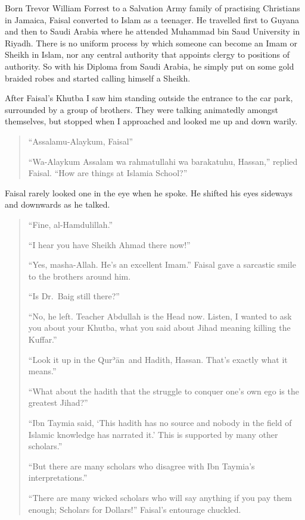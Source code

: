 \documentclass[12pt]{memoir}
\def\´{ʾ} %
\newcommand{\cor}[2]{#2} %
\def \Quran{Qur\-\´ān} %
\begin{document}
Born Trevor William Forrest to a Salvation Army family
of practising Christians in Jamaica,
Faisal converted to Islam as a teenager.
He travelled first to Guyana and then to Saudi Arabia
where he attended Muhammad bin Saud University in Riyadh.
There is no uniform process by which someone
can become an Imam or Sheikh in Islam,
nor any central authority that appoints clergy to positions of authority.
So with his Diploma from Saudi Arabia,
he simply put on some gold braided robes
and started calling himself a Sheikh.

After Faisal’s Khutba I saw him standing outside the entrance to the car park,
surrounded by a group of brothers.
They were talking animatedly amongst themselves,
but stopped when I approached and looked me up and down warily.

\begin{quote}
“Assalamu-Alaykum, Faisal”

“Wa-Alaykum Assalam wa rahmatullahi wa barakatuhu, Hassan,” replied Faisal.
“How are things at Islamia School?”
\end{quote}

Faisal rarely looked one in the eye when he spoke.
He shifted his eyes sideways and downwards as he talked.

\begin{quote}
“Fine, al-\cor{Hamdulilah}{Hamdulillah}.”

“I hear you have Sheikh Ahmad there now!”

“Yes, masha-Allah.
He’s an excellent Imam.”
Faisal gave a sarcastic smile to the brothers around him.

“Is Dr.\ Baig still there?”

“No, he left.
Teacher Abdullah is the Head now.
Listen, I wanted to ask you about your Khutba,
what you said about Jihad meaning killing the Kuffar.”

“Look it up in the \Quran\ and Hadith, Hassan.
That’s exactly what it means.”

“What about the hadith that the struggle to conquer one’s own ego
is the greatest Jihad?”

“Ibn Taymia said,
‘This hadith has no source and nobody in the field of Islamic knowledge
has narrated it.’
This is supported by many other scholars.”

“But there are many scholars who disagree with Ibn Taymia’s interpretations.”

“There are many wicked scholars who will say anything if you pay them enough;
Scholars for Dollars!”
Faisal’s entourage chuckled.
\end{quote}
\end{document}
